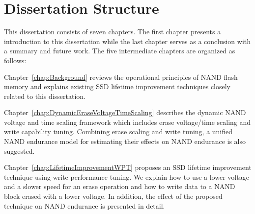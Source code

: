 \section{Dissertation Structure}
\label{sec:Intro_DissertationStructure}



This dissertation consists of seven chapters.
The first chapter presents a introduction to this dissertation while the last chapter serves as a conclusion with a summary and future work.
The five intermediate chapters are organized as follows:

Chapter~\ref{chap:Background} reviews the operational principles of NAND flash memory and explains existing SSD lifetime improvement techniques closely related to this dissertation.

Chapter~\ref{chap:DynamicEraseVoltageTimeScaling} describes the dynamic NAND voltage and time scaling framework which includes erase voltage/time scaling and write capability tuning.
Combining erase scaling and write tuning, a unified NAND endurance model for estimating their effects on NAND endurance is also suggested.

Chapter~\ref{chap:LifetimeImprovementWPT} proposes an SSD lifetime improvement technique using write-performance tuning.
We explain how to use a lower voltage and a slower speed for an erase operation and how to write data to a NAND block erased with a lower voltage.
In addition, the effect of the proposed technique on NAND endurance is presented in detail.

